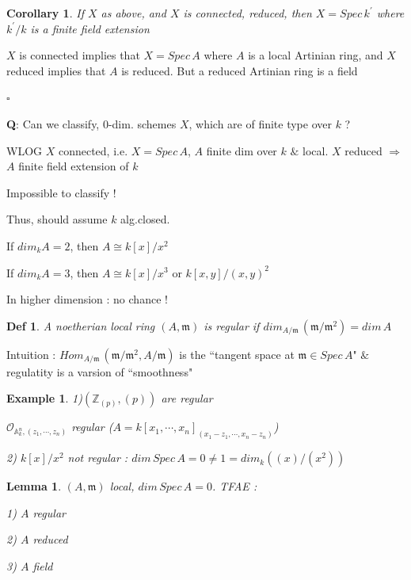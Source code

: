 \documentclass{article}
\newtheorem{definition}[theorem]{Def}
\newtheorem{lemma}[theorem]{Lemma}
\newtheorem{corollary}[theorem]{Corollary}
\newtheorem{example}[theorem]{Example}
\newenvironment{Proof}{{\noindent \indent \it Proof:\quad}}{\hfill $\square$\par}
\begin{document}
\begin{corollary}
If $X$ as above, and $X$ is connected, reduced, then $X = Spec\, k^\prime$
where
$k^\prime/k$ is a finite field extension
\end{corollary}
\begin{Proof}
$X$ is connected implies that $X = Spec\, A$ where $A$ is a local Artinian ring, and $X$ reduced implies
that $A$ is reduced. But a reduced Artinian ring is a field

\end{Proof}

\textbf{Q}: Can we classify, $0$-dim. schemes $X$, which are of finite type over $k$ ?

WLOG $X$ connected, i.e. $X=Spec\,A$, $A$ finite dim 
over $k$ $\&$ local. $X$ reduced $\Rightarrow$ $A$ finite field extension of $k$

Impossible to classify !

Thus, should assume $k$ alg.closed.

If $dim_kA=2$, then $A\cong k[x]/x^2$

If $dim_kA=3$, then $A\cong k[x]/x^3$ or $k[x,y]/(x,y)^2$

In higher dimension : no chance !

\begin{definition}
    A noetherian local ring $(A,\mathfrak m)$ is regular if $dim_{A/\mathfrak m}\, (\mathfrak m/\mathfrak m^2) = dim\,A$
\end{definition}

Intuition : $Hom_{A/\mathfrak m}\, (\mathfrak m/\mathfrak m^2, A/\mathfrak m)$ is the ``tangent space at $\mathfrak m\in Spec\,A$" $\&$ regulatity is a varsion of ``smoothness"

\begin{example}
    1)$(\mathbb Z_{(p)},(p))$ are regular
    
    $\mathcal O_{\mathbb A_k^n,(z_1,\cdots,z_n)}$ regular ($A=k[x_1,\cdots,x_n]_{(x_1-z_1,\cdots,x_n-z_n)}$)

    2) $k[x]/x^2$ not regular : $dim\,Spec\,A=0\ne1=dim_k((x)/(x^2))$
\end{example}

\begin{lemma}
    $(A,\mathfrak m)$ local, $dim\,Spec\,A=0$. TFAE :

    1) $A$ regular

    2) $A$ reduced

    3) $A$ field
\end{lemma}
\end{document}
